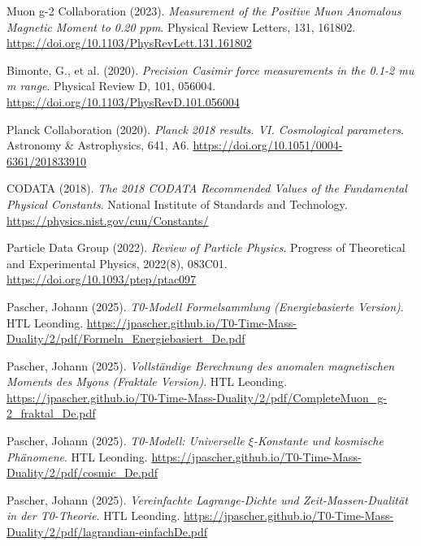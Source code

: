 \documentclass[12pt,a4paper]{article}
\theoremstyle{remark}
\begin{document}
\begin{thebibliography}{99}
	
	Muon g-2 Collaboration (2023). 
	\textit{Measurement of the Positive Muon Anomalous Magnetic Moment to 0.20 ppm}. 
	Physical Review Letters, 131, 161802.
	\url{https://doi.org/10.1103/PhysRevLett.131.161802}
	
	Bimonte, G., et al. (2020). 
	\textit{Precision Casimir force measurements in the 0.1-2 mu m range}. 
	Physical Review D, 101, 056004.
	\url{https://doi.org/10.1103/PhysRevD.101.056004}
	
	Planck Collaboration (2020). 
	\textit{Planck 2018 results. VI. Cosmological parameters}. 
	Astronomy \& Astrophysics, 641, A6. 
	\url{https://doi.org/10.1051/0004-6361/201833910}
	
	CODATA (2018). 
	\textit{The 2018 CODATA Recommended Values of the Fundamental Physical Constants}. 
	National Institute of Standards and Technology. 
	\url{https://physics.nist.gov/cuu/Constants/}
	
	Particle Data Group (2022). 
	\textit{Review of Particle Physics}. 
	Progress of Theoretical and Experimental Physics, 2022(8), 083C01.
	\url{https://doi.org/10.1093/ptep/ptac097}
	
	Pascher, Johann (2025). 
	\textit{T0-Modell Formelsammlung (Energiebasierte Version)}. 
	HTL Leonding. 
	\url{https://jpascher.github.io/T0-Time-Mass-Duality/2/pdf/Formeln_Energiebasiert_De.pdf}
	
	Pascher, Johann (2025). 
	\textit{Vollständige Berechnung des anomalen magnetischen Moments des Myons (Fraktale Version)}. 
	HTL Leonding. 
	\url{https://jpascher.github.io/T0-Time-Mass-Duality/2/pdf/CompleteMuon_g-2_fraktal_De.pdf}
	
	Pascher, Johann (2025). 
	\textit{T0-Modell: Universelle $\xi$-Konstante und kosmische Phänomene}. 
	HTL Leonding. 
	\url{https://jpascher.github.io/T0-Time-Mass-Duality/2/pdf/cosmic_De.pdf}
	
	Pascher, Johann (2025). 
	\textit{Vereinfachte Lagrange-Dichte und Zeit-Massen-Dualität in der T0-Theorie}. 
	HTL Leonding. 
	\url{https://jpascher.github.io/T0-Time-Mass-Duality/2/pdf/lagrandian-einfachDe.pdf}
	

\end{thebibliography}
\end{document}
